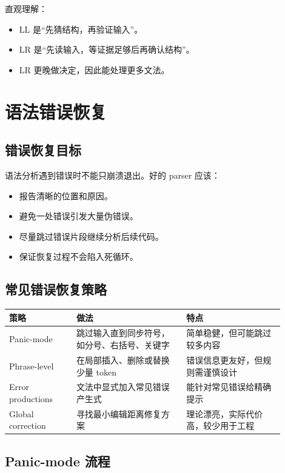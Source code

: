 \documentclass[UTF8,fontset=none,11pt]{ctexart}
\begin{document}
直观理解：

\begin{itemize}
  \item LL 是“先猜结构，再验证输入”。
  \item LR 是“先读输入，等证据足够后再确认结构”。
  \item LR 更晚做决定，因此能处理更多文法。
\end{itemize}

\section{语法错误恢复}

\subsection{错误恢复目标}

语法分析遇到错误时不能只崩溃退出。好的 parser 应该：

\begin{itemize}
  \item 报告清晰的位置和原因。
  \item 避免一处错误引发大量伪错误。
  \item 尽量跳过错误片段继续分析后续代码。
  \item 保证恢复过程不会陷入死循环。
\end{itemize}

\subsection{常见错误恢复策略}

\begin{longtable}{L{0.22\linewidth}L{0.36\linewidth}L{0.32\linewidth}}
\toprule
策略 & 做法 & 特点 \\
\midrule
Panic-mode & 跳过输入直到同步符号，如分号、右括号、关键字 & 简单稳健，但可能跳过较多内容 \\
Phrase-level & 在局部插入、删除或替换少量 token & 错误信息更友好，但规则需谨慎设计 \\
Error productions & 文法中显式加入常见错误产生式 & 能针对常见错误给精确提示 \\
Global correction & 寻找最小编辑距离修复方案 & 理论漂亮，实际代价高，较少用于工程 \\
\bottomrule
\end{longtable}

\subsection{Panic-mode 流程}
\end{document}
